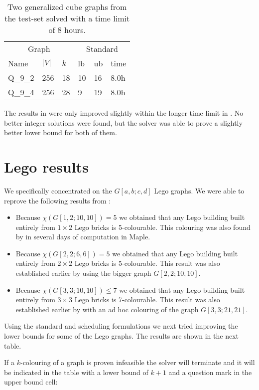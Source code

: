 \begin{table}[H]\label{table2}
\centering
\begin{tabular}{|lll|lll|}
\hline
\multicolumn{3}{|c|}{Graph}&\multicolumn{3}{c|}{Standard}\\
Name&$|V|$&$k$&lb&ub&time\\
\hline
Q\_9\_2&256&18&10&16&8.0h\\
\hline 
Q\_9\_4&256&28&9&19&8.0h\\
\hline
\end{tabular}
\caption{Two generalized cube graphs from the test-set solved with a time limit of 8 hours.}
\end{table}
\noindent The results in  were only improved slightly within the longer time limit in . No better integer solutions were found, but the solver was able to prove a slightly better lower bound for both of them.
\section{Lego results}
We specifically concentrated on the $G[a,b;c,d]$ Lego graphs. We were able to reprove the following results from \cite{Lego}\iffalse and from \cite{Søren Eilers private communication}\fi :
\begin{itemize}
\item Because $\chi (G[1,2;10,10]) = 5$ we obtained that any Lego building built entirely from $1\times 2$ Lego bricks is 5-colourable. This colouring was also found by \cite{Lego} in several days of computation in Maple.
\item Because $\chi (G[2,2;6,6]) = 5$ we obtained that any Lego building built entirely from $2\times 2$ Lego bricks is 5-colourable. This result was also established earlier by \cite{Lego} using the bigger graph $G[2,2;10,10]$.
\item Because $\chi (G[3,3;10,10]) \leq 7$ we obtained that any Lego building built entirely from $3\times 3$ Lego bricks is 7-colourable. This result was also established earlier by \cite{Lego} with an ad hoc colouring of the graph $G[3,3;21,21]$.
\end{itemize} 
Using the standard and scheduling formulations we next tried improving the lower bounds for some of the Lego graphs. The results are shown in the next table.

\noindent If a $k$-colouring of a graph is proven infeasible the solver will terminate and it will be indicated in the table with a  lower bound of $k+1$ and a question mark in the upper bound cell:

